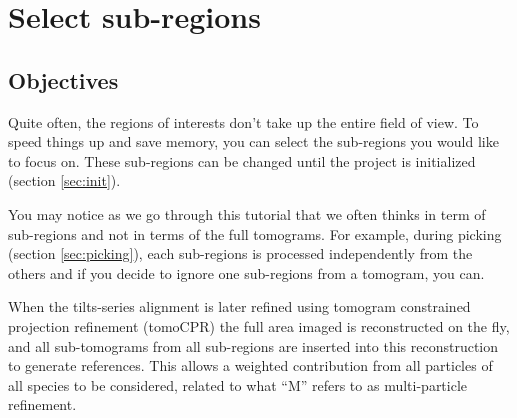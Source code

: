 \section{Select sub-regions} \label{sec:subregions}

\subsection{Objectives}
Quite often, the regions of interests don't take up the entire field of view. To speed things up and save memory, you can select the sub-regions you would like {\emClarity} to focus on. These sub-regions can be changed until the project is initialized (section \ref{sec:init}).

You may notice as we go through this tutorial that we often thinks in term of sub-regions and not in terms of the full tomograms. For example, during picking (section \ref{sec:picking}), each sub-regions is processed independently from the others and if you decide to ignore one sub-regions from a tomogram, you can.

    \begin{note} When the tilts-series alignment is later refined using tomogram constrained projection refinement (tomoCPR) the full area imaged is reconstructed on the fly, and all sub-tomograms from all sub-regions are inserted into this reconstruction to generate references. This allows a weighted contribution from all particles of all species to be considered, related to what ``M'' \cite{Tegunov2020} refers to as multi-particle refinement.
    \end{note}
    
